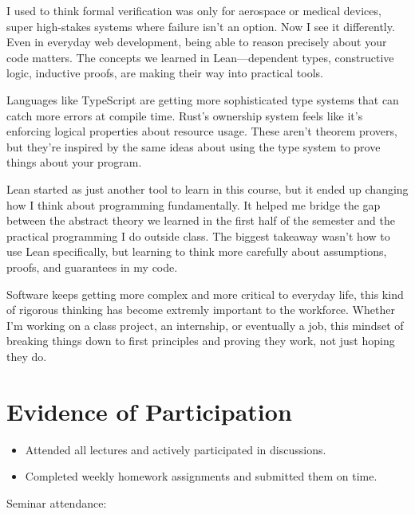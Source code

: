 \documentclass{article}
\theoremstyle{theorem}
\theoremstyle{definition}
\theoremstyle{remark}
\begin{document}
I used to think formal verification was only for aerospace or medical devices, super high-stakes systems where
failure isn't an option. Now I see it differently. Even in everyday web development, being able to reason precisely
about your code matters. The concepts we learned in Lean—dependent types, constructive logic, inductive proofs, are
making their way into practical tools.

Languages like TypeScript are getting more sophisticated type systems that can catch more errors at compile time.
Rust's ownership system feels like it's enforcing logical properties about resource usage. These aren't theorem
provers, but they're inspired by the same ideas about using the type system to prove things about your program.

Lean started as just another tool to learn in this course, but it ended up changing how I think about programming
fundamentally. It helped me bridge the gap between the abstract theory we learned in the first half of the semester and the
practical programming I do outside class. The biggest takeaway wasn't how to use Lean specifically, but learning to
think more carefully about assumptions, proofs, and guarantees in my code.

Software keeps getting more complex and more critical to everyday life, this kind of rigorous
thinking has become extremly important to the workforce. Whether I'm working on a class project, an internship, or eventually a
job, this mindset of breaking things down to first principles and proving they work, not just hoping they do.
\section{Evidence of Participation}

\begin{itemize}
    \item Attended all lectures and actively participated in discussions.
    \item Completed weekly homework assignments and submitted them on time.
\end{itemize}

Seminar attendance:
\end{document}

